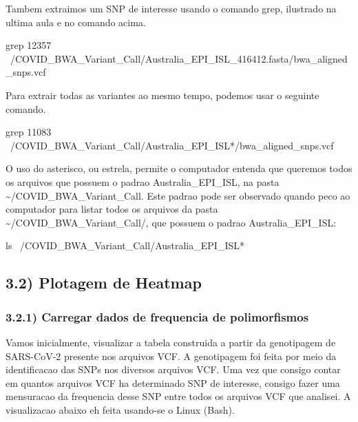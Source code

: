 \documentclass[
]{article}
\newenvironment{Shaded}{\begin{snugshade}}{\end{snugshade}}
\newcommand{\FunctionTok}[1]{\textcolor[rgb]{0.00,0.00,0.00}{#1}}
\newcommand{\NormalTok}[1]{#1}
\begin{document}
Tambem extraimos um SNP de interesse usando o comando grep, ilustrado na
ultima aula e no comando acima.

\begin{Shaded}
\begin{Highlighting}[]
\FunctionTok{grep}\NormalTok{ 12357 ~/COVID_BWA_Variant_Call/Australia_EPI_ISL_416412.fasta/bwa_aligned_snps.vcf}
\end{Highlighting}
\end{Shaded}

Para extrair todas as variantes ao mesmo tempo, podemos usar o seguinte
comando.

\begin{Shaded}
\begin{Highlighting}[]
\FunctionTok{grep}\NormalTok{ 11083 ~/COVID_BWA_Variant_Call/Australia_EPI_ISL*/bwa_aligned_snps.vcf}
\end{Highlighting}
\end{Shaded}

O uso do asterisco, ou estrela, permite o computador entenda que
queremos todos os arquivos que possuem o padrao Australia\_EPI\_ISL, na
pasta \textasciitilde/COVID\_BWA\_Variant\_Call. Este padrao pode ser
observado quando peco ao computador para listar todos os arquivos da
pasta \textasciitilde/COVID\_BWA\_Variant\_Call/, que possuem o padrao
Australia\_EPI\_ISL:

\begin{Shaded}
\begin{Highlighting}[]
\FunctionTok{ls}\NormalTok{ ~/COVID_BWA_Variant_Call/Australia_EPI_ISL*}
\end{Highlighting}
\end{Shaded}

\hypertarget{plotagem-de-heatmap}{%
\subsection{3.2) Plotagem de Heatmap}\label{plotagem-de-heatmap}}

\hypertarget{carregar-dados-de-frequencia-de-polimorfismos}{%
\subsubsection{3.2.1) Carregar dados de frequencia de
polimorfismos}\label{carregar-dados-de-frequencia-de-polimorfismos}}

Vamos inicialmente, visualizar a tabela construida a partir da
genotipagem de SARS-CoV-2 presente nos arquivos VCF. A genotipagem foi
feita por meio da identificacao das SNPs nos diversos arquivos VCF. Uma
vez que consigo contar em quantos arquivos VCF ha determinado SNP de
interesse, consigo fazer uma mensuracao da frequencia desse SNP entre
todos os arquivos VCF que analisei. A visualizacao abaixo eh feita
usando-se o Linux (Bash).
\end{document}
